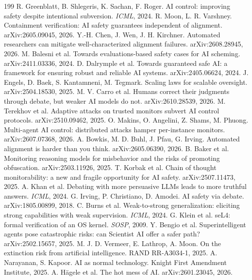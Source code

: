\documentclass[10pt,twocolumn]{article}
\theoremstyle{plain}
\theoremstyle{definition}
\begin{document}
\begin{thebibliography}{199}
 R. Greenblatt, B. Shlegeris, K. Sachan, F. Roger. AI control: improving safety despite intentional subversion. \emph{ICML}, 2024.
 R. Moon, L. R. Varshney. Containment verification: AI safety guarantees independent of alignment. arXiv:2605.09045, 2026.
 Y.-H. Chen, J. Wen, J. H. Kirchner. Automated researchers can mitigate well-characterized alignment failures. arXiv:2608.28945, 2026.
 M. Balesni et al. Towards evaluations-based safety cases for AI scheming. arXiv:2411.03336, 2024.
 D. Dalrymple et al. Towards guaranteed safe AI: a framework for ensuring robust and reliable AI systems. arXiv:2405.06624, 2024.
 J. Engels, D. Baek, S. Kantamneni, M. Tegmark. Scaling laws for scalable oversight. arXiv:2504.18530, 2025.
 M. V. Carro et al. Humans correct their judgments through debate, but weaker AI models do not. arXiv:2610.28539, 2026.
 M. Terekhov et al. Adaptive attacks on trusted monitors subvert AI control protocols. arXiv:2510.09462, 2025.
 O. Makins, O. Angelini, Z. Shams, M. Phuong. Multi-agent AI control: distributed attacks hamper per-instance monitors. arXiv:2607.07368, 2026.
 A. Bowkis, M. D. Buhl, J. Pfau, G. Irving. Automated alignment is harder than you think. arXiv:2605.06390, 2026.
 B. Baker et al. Monitoring reasoning models for misbehavior and the risks of promoting obfuscation. arXiv:2503.11926, 2025.
 T. Korbak et al. Chain of thought monitorability: a new and fragile opportunity for AI safety. arXiv:2507.11473, 2025.
 A. Khan et al. Debating with more persuasive LLMs leads to more truthful answers. \emph{ICML}, 2024.
 G. Irving, P. Christiano, D. Amodei. AI safety via debate. arXiv:1805.00899, 2018.
 C. Burns et al. Weak-to-strong generalization: eliciting strong capabilities with weak supervision. \emph{ICML}, 2024.
 G. Klein et al. seL4: formal verification of an OS kernel. \emph{SOSP}, 2009.
 Y. Bengio et al. Superintelligent agents pose catastrophic risks: can Scientist AI offer a safer path? arXiv:2502.15657, 2025.
 M. J. D. Vermeer, E. Lathrop, A. Moon. On the extinction risk from artificial intelligence. RAND RR-A3034-1, 2025.
 A. Narayanan, S. Kapoor. AI as normal technology. Knight First Amendment Institute, 2025.
 A. H\"agele et al. The hot mess of AI. arXiv:2601.23045, 2026.

\end{thebibliography}
\end{document}
